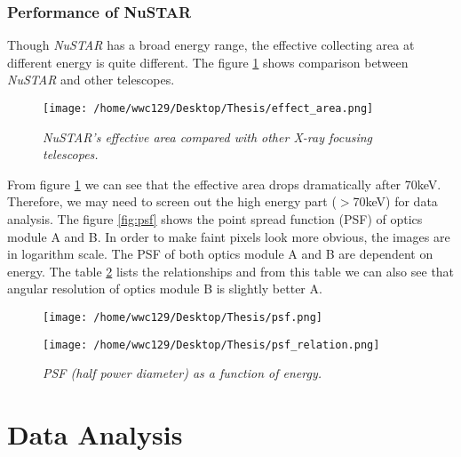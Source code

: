 \documentclass[12pt]{report}
\newcommand{\mycaption}[1]{\caption{\textit{\footnotesize #1}}}
\begin{document}
        \subsection{Performance of NuSTAR}
            Though \textit{NuSTAR} has a broad energy range, the effective collecting area at different energy is 
            quite different. The figure \ref{fig:effective_area} shows comparison between \textit{NuSTAR} and other 
            telescopes.
            \begin{figure}[h!]
              \centering
              \texttt{[image: /home/wwc129/Desktop/Thesis/effect\_area.png]}
              \mycaption{\textit{NuSTAR}'s effective area compared with other X-ray focusing telescopes.}
              \label{fig:effective_area}
            \end{figure}
            
            From figure \ref{fig:effective_area} we can see that the effective area drops dramatically after 70keV.
            Therefore, we may need to screen out the high energy part ($>$70keV) for data analysis.
            The figure \ref{fig:psf} shows the point spread function (PSF) of optics module A and B. In order to
            make faint pixels look more obvious, the images are in logarithm scale. The PSF of both optics module A
            and B are dependent on energy. The table \ref{table:psf_relation} lists the relationships and from this 
            table we can also see that angular resolution of optics module B is slightly better A.
            
             
            \begin{figure}[!htp]
              \centering
              \texttt{[image: /home/wwc129/Desktop/Thesis/psf.png]}
              \mycaption{Image of NuSTAR's point spread function of optics module A(left) and B(right).}
              \label{fig:psf}
              \vspace{1.5cm} 
              \texttt{[image: /home/wwc129/Desktop/Thesis/psf\_relation.png]}
              \mycaption{PSF (half power diameter) as a function of energy.}
              \label{table:psf_relation}
            \end{figure}
           

\chapter{Data Analysis}
\end{document}
